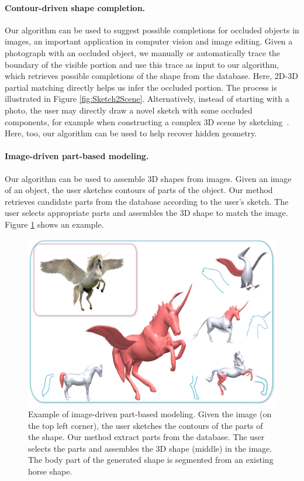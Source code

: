 \paragraph*{Contour-driven shape completion.} Our algorithm can be used to suggest possible completions for occluded objects in images, an important application in computer vision and image editing. Given a photograph with an occluded object, we manually or automatically trace the boundary of the visible portion and use this trace as input to our algorithm, which retrieves possible completions of the shape from the database. Here, 2D-3D partial matching directly helps us infer the occluded portion. The process is illustrated in Figure \ref{fig:Sketch2Scene}. Alternatively, instead of starting with a photo, the user may directly draw a novel sketch with some occluded components, for example when constructing a complex 3D scene by sketching~\cite{KunXu2013}. Here, too, our algorithm can be used to help recover hidden geometry.

\paragraph*{Image-driven part-based modeling.} Our algorithm can be used to assemble 3D shapes from images. Given an image of an object, the user sketches contours of parts of the object. Our method retrieves candidate parts from the database according to the user's sketch. The user selects appropriate parts and assembles the 3D shape to match the image. Figure \ref{fig:ImageModeling} shows an example.

\begin{figure}\centering
\includegraphics[width=\linewidth]{./Material/PhotoDrivenModeling.pdf}
\caption{Example of image-driven part-based modeling. Given the image (on the top left corner), the user sketches the contours of the parts of the shape. Our method extract parts from the database. The user selects the parts and assembles the 3D shape (middle) in the image. The body part of the generated shape is segmented from an existing horse shape.}\label{fig:ImageModeling}
\end{figure}

